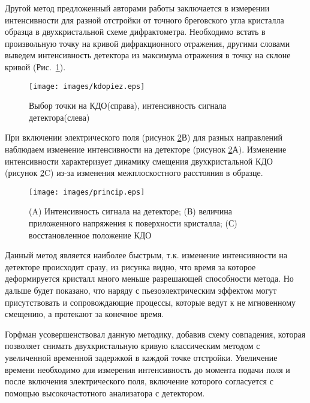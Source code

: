 Другой метод предложенный авторами работы \cite{piezo50} заключается в измерении интенсивности для разной
отстройки от точного бреговского угла кристалла образца в двухкристальной схеме дифрактометра.
Необходимо  встать в произвольную точку на кривой дифракционного отражения,
другими словами выведем интенсивность детектора из максимума отражения в точку на склоне
 кривой (Рис.~\ref{ris:kdopiez}).

\begin{figure}[H]
\centering
\texttt{[image: images/kdopiez.eps]}
\caption{Выбор точки на КДО(справа), интенсивность сигнала детектора(слева)}
\label{ris:kdopiez}
\end{figure}

При включении электрического поля (рисунок \ref{ris:princip}В) для разных направлений наблюдаем изменение интенсивности
на детекторе (рисунок \ref{ris:princip}А). Изменение интенсивности характеризует динамику смещения
двухкристальной КДО (рисунок \ref{ris:princip}C) из-за изменения межплоскостного расстояния в образце.

\begin{figure}[H]
\centering
\texttt{[image: images/princip.eps]}
\caption{(A) Интенсивность сигнала на детекторе; (В) величина  приложенного напряжения к
поверхности кристалла; (С) восстановленное положение КДО  }
\label{ris:princip}
\end{figure}

Данный метод является наиболее быстрым, т.к. изменение интенсивности на детекторе происходит сразу,
из рисунка видно, что время за которое деформируется кристалл много меньше разрешающей способности метода.
Но дальше будет показано, что наряду с пьезоэлектрическим эффектом могут присутствовать и сопровождающие
процессы, которые ведут к не мгновенному смещению, а протекают за конечное время.

  Горфман \cite{piezo51} усовершенствовал данную методику, добавив схему совпадения, которая позволяет
  снимать двухкристальную кривую классическим методом с увеличенной временной задержкой в каждой точке отстройки.
  Увеличение времени необходимо для измерения интенсивность до момента подачи поля и после включения
   электрического поля, включение которого согласуется с помощью высокочастотного анализатора с детектором.
